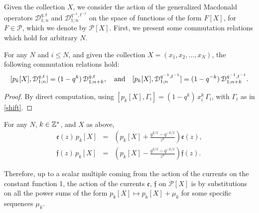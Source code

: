 Given the collection $X$, we
 consider the action of the generalized Macdonald operators ${\mathcal D}^{q,t}_{1;n}$ and
${\mathcal D}^{q^{-1},t^{-1}}_{1;n}$ on the space of functions of the form $F[X]$, for $F\in {\mathcal P}$, which we denote by ${\mathcal P}[X]$. First, we present some commutation relations which hold for arbitrary $N$.

\begin{lemma}\label{compk}
For any $N$ and $i\leq N$, and given the collection $X=(x_1,x_2,...,x_N)$, the following commutation relations hold:
$$
[p_k[X], {\mathcal D}^{q,t}_{1;n}]=(1-q^k) \, {\mathcal D}^{q,t}_{1;n+k},\quad {\rm and}\quad 
[p_k[X], {\mathcal D}^{q^{-1},t^{-1}}_{1;n}]=(1-q^{-k}) \, {\mathcal D}^{q^{-1},t^{-1}}_{1;n+k}.
$$
\end{lemma}
\begin{proof} By direct computation, using $[p_k[X],\Gamma_i]=(1-q^k)\,x_i^k\,\Gamma_i$, with $\Gamma_i$ as in \eqref{shift}.\end{proof}


\begin{cor}\label{efpleth} For any $N$, $k\in {\mathbb Z}^*$, and $X$ as above,
\begin{eqnarray*}
{\mathfrak e}(z)\, p_k[X]&=&\left( p_k[X]+\frac{q^{k/2}-q^{-k/2}}{z^k} \right) {\mathfrak e}(z),\\
{\mathfrak f}(z)\, p_k[X]&=&\left( p_k[X]-\frac{q^{k/2}-q^{-k/2}}{z^k} \right) {\mathfrak f}(z).
\end{eqnarray*}
\end{cor}

Therefore, up to a scalar multiple coming from the action of the currents on the constant function 1, the action of the currents ${\mathfrak e}$, ${\mathfrak f}$ on ${\mathcal P}[X]$
is by substitutions on all the power sums of the form $p_k[X]\mapsto p_k[X]+\mu_k$ for some specific sequences $\mu_k$.

